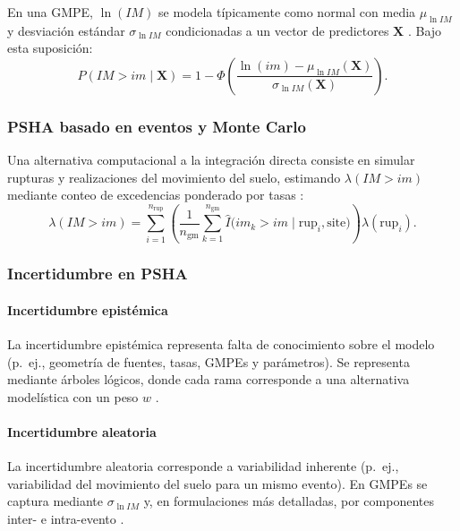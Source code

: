 En una GMPE, \(\ln(IM)\) se modela típicamente como normal con media \(\mu_{\ln IM}\) y desviación estándar \(\sigma_{\ln IM}\) condicionadas a un vector de predictores \(\mathbf{X}\) \cite{BakerBradleyStafford2021}. Bajo esta suposición:
\begin{equation}
P(IM > im \mid \mathbf{X}) = 1 - \Phi\left(\frac{\ln(im) - \mu_{\ln IM}(\mathbf{X})}{\sigma_{\ln IM}(\mathbf{X})}\right).
\label{eq:gmpe_exceedance_probability}
\end{equation}

\subsubsection{PSHA basado en eventos y Monte Carlo}

Una alternativa computacional a la integración directa consiste en simular rupturas y realizaciones del movimiento del suelo, estimando \(\lambda(IM>im)\) mediante conteo de excedencias ponderado por tasas \cite{EbelKafka1999,AssatouriansAtkinson2013,BakerBradleyStafford2021}:
\begin{equation}
\lambda(IM > im) = \sum_{i=1}^{n_{\text{rup}}}\left(\frac{1}{n_{\text{gm}}}\sum_{k=1}^{n_{\text{gm}}}\hat{I}\big(im_k > im \mid \text{rup}_i,\text{site}\big)\right)\lambda(\text{rup}_i).
\label{eq:psha_monte_carlo_v2}
\end{equation}


\subsubsection{Incertidumbre en PSHA}

\paragraph{Incertidumbre epistémica}
La incertidumbre epistémica representa falta de conocimiento sobre el modelo (p.\ ej., geometría de fuentes, tasas, GMPEs y parámetros). Se representa mediante árboles lógicos, donde cada rama corresponde a una alternativa modelística con un peso \(w\) \cite{BakerBradleyStafford2021}.

\paragraph{Incertidumbre aleatoria}
La incertidumbre aleatoria corresponde a variabilidad inherente (p.\ ej., variabilidad del movimiento del suelo para un mismo evento). En GMPEs se captura mediante \(\sigma_{\ln IM}\) y, en formulaciones más detalladas, por componentes inter- e intra-evento \cite{BakerBradleyStafford2021}.

